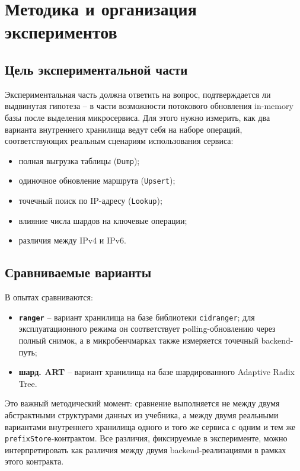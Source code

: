 \section{Методика и организация экспериментов}
\label{sec:methodology}

\subsection{Цель экспериментальной части}

Экспериментальная часть должна ответить на вопрос, подтверждается ли
выдвинутая гипотеза -- в части возможности потокового обновления
in-memory базы после выделения микросервиса. Для этого нужно измерить,
как два варианта внутреннего хранилища ведут себя на наборе операций,
соответствующих реальным сценариям использования сервиса:

\begin{itemize}
\item полная выгрузка таблицы (\texttt{Dump});
\item одиночное обновление маршрута (\texttt{Upsert});
\item точечный поиск по IP-адресу (\texttt{Lookup});
\item влияние числа шардов на ключевые операции;
\item различия между IPv4 и IPv6.
\end{itemize}

\subsection{Сравниваемые варианты}

В опытах сравниваются:

\begin{itemize}
\item \textbf{\texttt{ranger}} -- вариант хранилища на базе
библиотеки \texttt{cidranger}; для эксплуатационного режима он
соответствует polling-обновлению через полный снимок, а в микробенчмарках
также измеряется точечный backend-путь;
\item \textbf{шард. ART} -- вариант хранилища на базе шардированного
Adaptive Radix Tree.
\end{itemize}

Это важный методический момент: сравнение выполняется не между двумя
абстрактными структурами данных из учебника, а между двумя реальными
вариантами внутреннего хранилища одного и того же сервиса с одним и тем же
\texttt{prefixStore}-контрактом. Все различия, фиксируемые в
эксперименте, можно интерпретировать как различия между
двумя backend-реализациями в рамках этого контракта.

